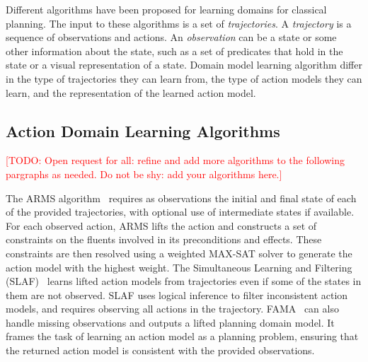 \documentclass{article}
\theoremstyle{definition}
\theoremstyle{remark}
\newcommand{\todo}[1]{{\textcolor{red}{[TODO: #1]}}}
\begin{document}
Different algorithms have been proposed for learning domains for classical planning. 
The input to these algorithms is a set of \emph{trajectories}. 
A \emph{trajectory} is a sequence of observations and actions. 
An \emph{observation} can be a state or some other information about the state, 
such as a set of predicates that hold in the state or a visual representation of a state. 
Domain model learning algorithm differ in the type of trajectories they can learn from, the type of action models they can learn, and the representation of the learned action model. 


\subsection{Action Domain Learning Algorithms}

\todo{Open request for all: refine and add more algorithms to the following pargraphs as needed. Do not be shy: add your algorithms here.}

The ARMS algorithm~\citep{yang2007learning} requires as observations the initial and final state of each of the provided trajectories, with optional use of intermediate states if available. For each observed action, ARMS lifts the action and constructs a set of constraints on the fluents involved in its preconditions and effects. These constraints are then resolved using a weighted MAX-SAT solver to generate the action model with the highest weight.
The Simultaneous Learning and Filtering (SLAF)~\citep{amir2008learning} learns lifted action models from trajectories even if some of the states in them are not observed. 
SLAF uses logical inference to filter inconsistent action models, and requires observing all actions in the trajectory.  
FAMA~\citep{aineto2019learning} can also handle missing observations and outputs a lifted planning domain model. 
It frames the task of learning an action model as a planning problem, ensuring that the returned action model is consistent with the provided observations.
\end{document}
